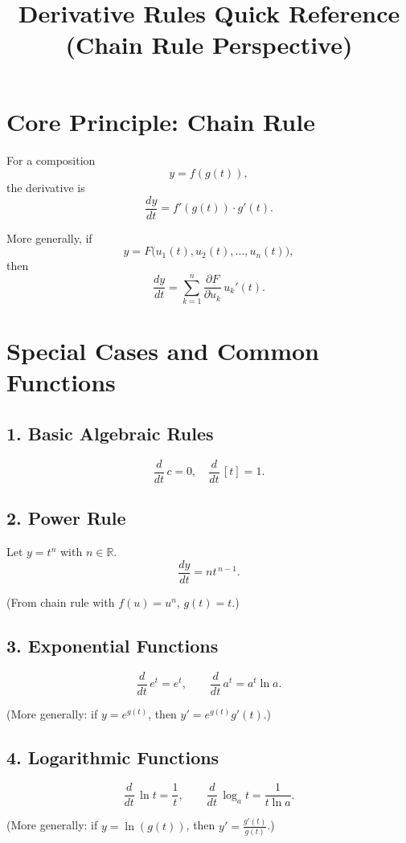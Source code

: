 \documentclass[11pt,a4paper]{article}
\title{Derivative Rules Quick Reference (Chain Rule Perspective)}
\author{}
\date{}
\begin{document}
	\maketitle
	
	\section*{Core Principle: Chain Rule}
	For a composition
	$$
	y = f(g(t)),
	$$
	the derivative is
	$$
	\frac{dy}{dt} = f'(g(t)) \cdot g'(t).
	$$
	
	More generally, if
	$$
	y = F\big(u_1(t),u_2(t),\dots,u_n(t)\big),
	$$
	then
	$$
	\frac{dy}{dt} = \sum_{k=1}^n \frac{\partial F}{\partial u_k}\,u_k'(t).
	$$
	
	\bigskip
	
	\section*{Special Cases and Common Functions}
	
	\subsection*{1. Basic Algebraic Rules}
	\[
	\frac{d}{dt}\,c = 0, \quad
	\frac{d}{dt}\,[t] = 1.
	\]
	
	\subsection*{2. Power Rule}
	Let $y = t^n$ with $n \in \mathbb{R}$.
	\[
	\frac{dy}{dt} = n t^{\,n-1}.
	\]
	
	(From chain rule with $f(u)=u^n$, $g(t)=t$.)
	
	\subsection*{3. Exponential Functions}
	\[
	\frac{d}{dt}\,e^t = e^t, \qquad
	\frac{d}{dt}\,a^t = a^t \ln a.
	\]
	
	(More generally: if $y=e^{g(t)}$, then $y' = e^{g(t)} g'(t)$.)
	
	\subsection*{4. Logarithmic Functions}
	\[
	\frac{d}{dt}\,\ln t = \frac{1}{t}, \qquad
	\frac{d}{dt}\,\log_a t = \frac{1}{t\ln a}.
	\]
	
	(More generally: if $y=\ln(g(t))$, then $y'=\tfrac{g'(t)}{g(t)}$.)
	
\end{document}
